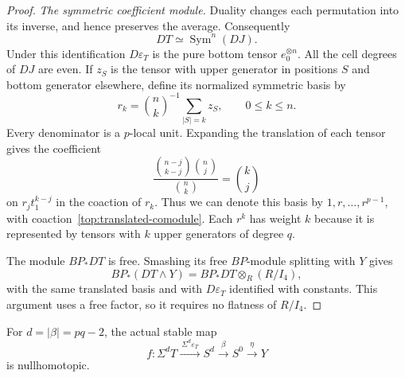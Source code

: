 \begin{proof}
\smallskip\noindent\emph{The symmetric coefficient module.}
Duality changes each permutation into its inverse, and hence
preserves the average. Consequently
\[
 DT\simeq\operatorname{Sym}^{n}(DJ).
\]
Under this identification $D\varepsilon_T$ is the pure bottom
tensor $e_0^{\otimes n}$. All the cell degrees of $DJ$ are even.
If $z_S$ is the tensor with upper generator in positions $S$ and
bottom generator elsewhere, define its normalized symmetric
basis by
\begin{equation}
\label{top:symmetric-basis}
 r_k=\binom nk^{-1}\sum_{|S|=k}z_S,
 \qquad 0\leq k\leq n.
\end{equation}
Every denominator is a $p$-local unit. Expanding the translation
of each tensor gives the coefficient
\[
 \frac{\binom{n-j}{k-j}\binom nj}{\binom nk}=\binom kj
\]
on $r_jt_1^{k-j}$ in the coaction of $r_k$.
Thus we can denote this basis by $1,r,\ldots,r^{p-1}$, with
coaction~\eqref{top:translated-comodule}. Each $r^k$ has weight $k$
because it is represented by tensors with $k$ upper generators of
degree $q$.

The module $BP_*DT$ is free. Smashing its free $BP$-module
splitting with $Y$ gives
\[
 BP_*(DT\wedge Y)=BP_*DT\otimes_R(R/I_4),
\]
with the same translated basis and with $D\varepsilon_T$ identified
with constants. This argument uses a free factor, so it requires
no flatness of $R/I_4$.
\end{proof}

\begin{proposition}
\label{top:symmetric-null-map}
For $d=|\beta|=pq-2$, the actual stable map
\begin{equation}
\label{top:null-composite}
 f:\Sigma^dT\xrightarrow{\ \Sigma^d\varepsilon_T\ }S^d
       \xrightarrow{\ \beta\ }S^0
       \xrightarrow{\ \eta\ }Y
\end{equation}
is nullhomotopic.
\end{proposition}


